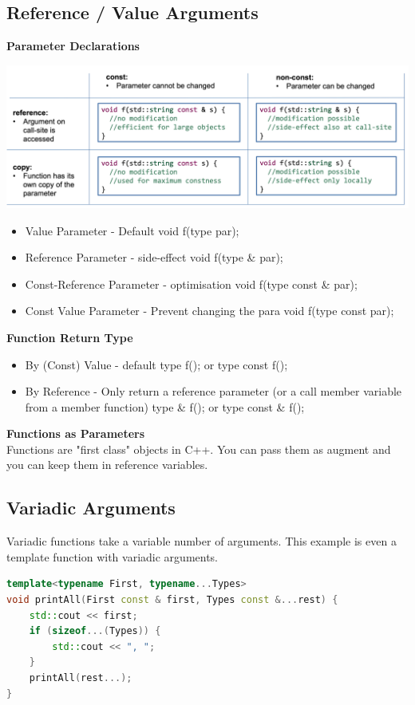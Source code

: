 \subsection{Reference / Value Arguments}
\textbf{Parameter Declarations}
\begin{center}
	\includegraphics[width=0.75\linewidth]{images/functionparameters}	
\end{center}

\begin{itemize}
  \itemsep -0.5em 
  \item Value Parameter - Default void f(type par);
  \item Reference Parameter - side-effect void f(type \& par);
  \item Const-Reference Parameter - optimisation void f(type const \& par);
  \item Const Value Parameter - Prevent changing the para void f(type const par);
\end{itemize}

\textbf{Function Return Type} \\
\begin{itemize}
  \itemsep -0.5em 
  \item By (Const) Value - default type f(); or type const f();
  \item By Reference - Only return a reference parameter (or a call member variable from a member function) type \& f(); or type const \& f();
\end{itemize}

\textbf{Functions as Parameters} \\
Functions are "first class" objects in C++. You can pass them as augment and you can keep them in reference variables.

\subsection{Variadic Arguments}
Variadic functions take a variable number of arguments. This example is even a template function with variadic arguments.
\begin{lstlisting}[language=C++]
template<typename First, typename...Types> 
void printAll(First const & first, Types const &...rest) {
	std::cout << first;
	if (sizeof...(Types)) {
		std::cout << ", "; 
	} 
	printAll(rest...);
}
\end{lstlisting}


